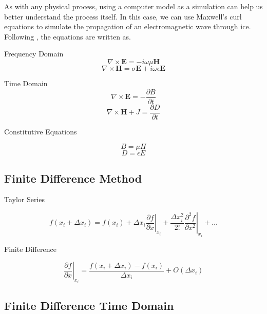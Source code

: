 \documentclass[a4paper]{article}
\begin{document}
\par
As with any physical process, using a computer model as a simulation can help us better understand the process itself. In this case, we can use Maxwell's curl equations to simulate the propagation of an electromagnetic wave through ice. Following \cite{Irving2006}, the equations are written as. 


Frequency Domain
\begin{equation}
    \nabla \times \textbf{E} = -i\omega \mu \textbf{H}
\end{equation}
\begin{equation}
    \nabla \times \textbf{H} = \sigma \textbf{E} + i\omega \epsilon \textbf{E}
\end{equation}

Time Domain
\begin{equation}
    \nabla \times \textbf{E} = - \frac{\partial B}{\partial t}
\end{equation}
\begin{equation}
    \nabla \times \textbf{H} + J =\frac{\partial D}{\partial t}
\end{equation}

Constitutive Equations

\begin{equation}
    B = \mu H    
\end{equation}
\begin{equation}
    D = \epsilon E    
\end{equation}

\subsection{Finite Difference Method}

Taylor Series

\begin{equation}
    f(x_i + \Delta x_i) = f(x_i) + \Delta x_i \left. \frac{\partial f}{\partial x} \right\vert_{x_i} + \frac{\Delta x_i^2}{2!} \left. \frac{\partial^2 f}{\partial x^2} \right\vert_{x_i} + \dots
\end{equation}

Finite Difference

\begin{equation}
    \left. \frac{\partial f}{\partial x} \right\vert_{x_i} = \frac{f(x_i + \Delta x_i) - f(x_i)}{\Delta x_i} + O(\Delta x_i)
\end{equation}


\subsection{Finite Difference Time Domain}
\end{document}

